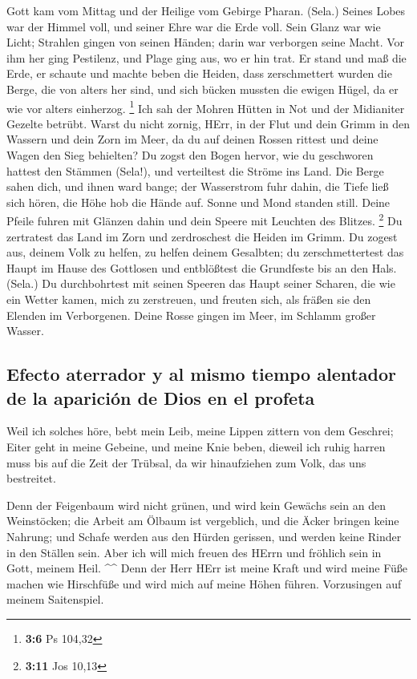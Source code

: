  Gott kam vom Mittag und der Heilige vom Gebirge Pharan.
(Sela.) Seines Lobes war der Himmel voll, und seiner Ehre war die Erde
voll.  Sein Glanz war wie Licht; Strahlen gingen von
seinen Händen; darin war verborgen seine Macht.  Vor ihm
her ging Pestilenz, und Plage ging aus, wo er hin trat. 
Er stand und maß die Erde, er schaute und machte beben die Heiden, dass
zerschmettert wurden die Berge, die von alters her sind, und sich bücken
mussten die ewigen Hügel, da er wie vor alters einherzog. \footnote{\textbf{3:6}
  Ps 104,32}  Ich sah der Mohren Hütten in Not und der
Midianiter Gezelte betrübt.  Warst du nicht zornig, HErr,
in der Flut und dein Grimm in den Wassern und dein Zorn im Meer, da du
auf deinen Rossen rittest und deine Wagen den Sieg behielten?
 Du zogst den Bogen hervor, wie du geschworen hattest den
Stämmen (Sela!), und verteiltest die Ströme ins Land. 
Die Berge sahen dich, und ihnen ward bange; der Wasserstrom fuhr dahin,
die Tiefe ließ sich hören, die Höhe hob die Hände auf. 
Sonne und Mond standen still. Deine Pfeile fuhren mit Glänzen dahin und
dein Speere mit Leuchten des Blitzes. \footnote{\textbf{3:11} Jos 10,13}
 Du zertratest das Land im Zorn und zerdroschest die
Heiden im Grimm.  Du zogest aus, deinem Volk zu helfen,
zu helfen deinem Gesalbten; du zerschmettertest das Haupt im Hause des
Gottlosen und entblößtest die Grundfeste bis an den Hals. (Sela.)
 Du durchbohrtest mit seinen Speeren das Haupt seiner
Scharen, die wie ein Wetter kamen, mich zu zerstreuen, und freuten sich,
als fräßen sie den Elenden im Verborgenen.  Deine Rosse
gingen im Meer, im Schlamm großer Wasser.

\hypertarget{efecto-aterrador-y-al-mismo-tiempo-alentador-de-la-apariciuxf3n-de-dios-en-el-profeta}{%
\subsection{Efecto aterrador y al mismo tiempo alentador de la aparición
de Dios en el
profeta}\label{efecto-aterrador-y-al-mismo-tiempo-alentador-de-la-apariciuxf3n-de-dios-en-el-profeta}}

 Weil ich solches höre, bebt mein Leib, meine Lippen
zittern von dem Geschrei; Eiter geht in meine Gebeine, und meine Knie
beben, dieweil ich ruhig harren muss bis auf die Zeit der Trübsal, da
wir hinaufziehen zum Volk, das uns bestreitet.

 Denn der Feigenbaum wird nicht grünen, und wird kein
Gewächs sein an den Weinstöcken; die Arbeit am Ölbaum ist vergeblich,
und die Äcker bringen keine Nahrung; und Schafe werden aus den Hürden
gerissen, und werden keine Rinder in den Ställen sein. 
Aber ich will mich freuen des HErrn und fröhlich sein in Gott, meinem
Heil. \^{}\^{}  Denn der Herr HErr ist meine Kraft und
wird meine Füße machen wie Hirschfüße und wird mich auf meine Höhen
führen. Vorzusingen auf meinem Saitenspiel.
